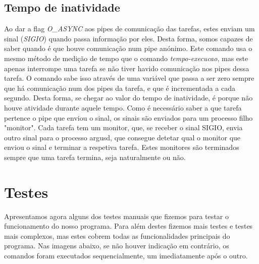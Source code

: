 \documentclass[a4paper]{report}
\begin{document}
	\section{Tempo de inatividade}
	Ao dar a flag \emph{O\_ASYNC} aos pipes de comunicação das tarefas, estes enviam um sinal (\emph{SIGIO}) quando passa informação por eles. Desta forma, somos capazes de saber quando é que houve comunicação num pipe anónimo. Este comando usa o mesmo método de medição de tempo que o comando \emph{tempo-execucao}, mas este apenas interrompe uma tarefa se não tiver havido comunicação nos pipes dessa tarefa. O comando sabe isso através de uma variável que passa a ser zero sempre que há comunicação num dos pipes da tarefa, e que é incrementada a cada segundo. Desta forma, se chegar ao valor do tempo de inatividade, é porque não houve atividade durante aquele tempo. Como é necessário saber a que tarefa pertence o pipe que enviou o sinal, os sinais são enviados para um processo filho "monitor". Cada tarefa tem um monitor, que, se receber o sinal SIGIO, envia outro sinal para o processo argusd, que consegue detetar qual o monitor que enviou o sinal e terminar a respetiva tarefa. Estes monitores são terminados sempre que uma tarefa termina, seja naturalmente ou não.
		
	\chapter{Testes}
	
	Apresentamos agora alguns dos testes manuais que fizemos para testar o funcionamento do nosso programa. Para além destes fizemos mais testes e testes mais complexos, mas estes cobrem todas as funcionalidades principais do programa. Nas imagens abaixo, se não houver indicação em contrário, os comandos foram executados sequencialmente, um imediatamente após o outro.
	
\end{document}
